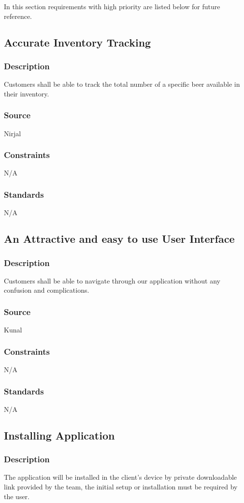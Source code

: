 In this section requirements with high priority are listed below for future reference.

\subsection{Accurate Inventory Tracking}
\subsubsection{Description}
Customers shall be able to track the total number of a specific beer available in their inventory.
\subsubsection{Source}
Nirjal
\subsubsection{Constraints}
N/A
\subsubsection{Standards}
N/A


\subsection{An Attractive and easy to use User Interface}
\subsubsection{Description}
Customers shall be able to navigate through our application without any confusion and complications.
\subsubsection{Source}
Kunal
\subsubsection{Constraints}
N/A
\subsubsection{Standards}
N/A


\subsection{Installing Application}
\subsubsection{Description}
The application will be installed in the client's device by private downloadable link provided by the team, the initial setup or installation must be required by the user.   
